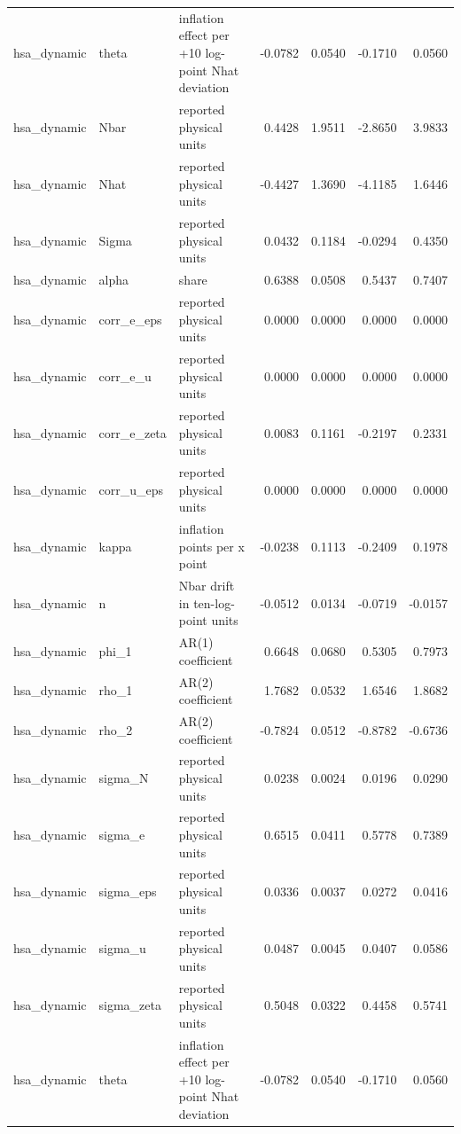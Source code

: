 \begin{tabular}{lllrrrr}
hsa\_dynamic & theta & inflation effect per +10 log-point Nhat deviation & -0.0782 & 0.0540 & -0.1710 & 0.0560 \\
hsa\_dynamic & Nbar & reported physical units & 0.4428 & 1.9511 & -2.8650 & 3.9833 \\
hsa\_dynamic & Nhat & reported physical units & -0.4427 & 1.3690 & -4.1185 & 1.6446 \\
hsa\_dynamic & Sigma & reported physical units & 0.0432 & 0.1184 & -0.0294 & 0.4350 \\
hsa\_dynamic & alpha & share & 0.6388 & 0.0508 & 0.5437 & 0.7407 \\
hsa\_dynamic & corr\_e\_eps & reported physical units & 0.0000 & 0.0000 & 0.0000 & 0.0000 \\
hsa\_dynamic & corr\_e\_u & reported physical units & 0.0000 & 0.0000 & 0.0000 & 0.0000 \\
hsa\_dynamic & corr\_e\_zeta & reported physical units & 0.0083 & 0.1161 & -0.2197 & 0.2331 \\
hsa\_dynamic & corr\_u\_eps & reported physical units & 0.0000 & 0.0000 & 0.0000 & 0.0000 \\
hsa\_dynamic & kappa & inflation points per x point & -0.0238 & 0.1113 & -0.2409 & 0.1978 \\
hsa\_dynamic & n & Nbar drift in ten-log-point units & -0.0512 & 0.0134 & -0.0719 & -0.0157 \\
hsa\_dynamic & phi\_1 & AR(1) coefficient & 0.6648 & 0.0680 & 0.5305 & 0.7973 \\
hsa\_dynamic & rho\_1 & AR(2) coefficient & 1.7682 & 0.0532 & 1.6546 & 1.8682 \\
hsa\_dynamic & rho\_2 & AR(2) coefficient & -0.7824 & 0.0512 & -0.8782 & -0.6736 \\
hsa\_dynamic & sigma\_N & reported physical units & 0.0238 & 0.0024 & 0.0196 & 0.0290 \\
hsa\_dynamic & sigma\_e & reported physical units & 0.6515 & 0.0411 & 0.5778 & 0.7389 \\
hsa\_dynamic & sigma\_eps & reported physical units & 0.0336 & 0.0037 & 0.0272 & 0.0416 \\
hsa\_dynamic & sigma\_u & reported physical units & 0.0487 & 0.0045 & 0.0407 & 0.0586 \\
hsa\_dynamic & sigma\_zeta & reported physical units & 0.5048 & 0.0322 & 0.4458 & 0.5741 \\
hsa\_dynamic & theta & inflation effect per +10 log-point Nhat deviation & -0.0782 & 0.0540 & -0.1710 & 0.0560 \\

\end{tabular}
